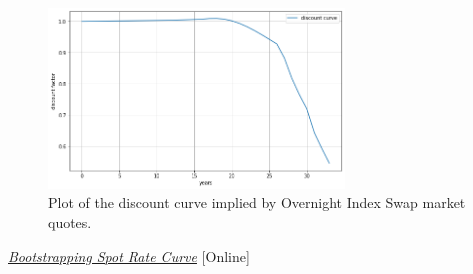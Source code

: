 \begin{figure}[htb]
	\centering
	\includegraphics[width=0.7\textwidth]{figures/example_discount_curve.png}
	\caption{Plot of the discount curve implied by Overnight Index Swap market quotes.}
	\label{fig:discount_curve}
\end{figure}

\begin{thebibliography}{9}
	 \href{https://financetrain.com/bootstrapping-spot-rate-curve-zero-curve}{\emph{Bootstrapping Spot Rate Curve}} [Online]
\end{thebibliography}
